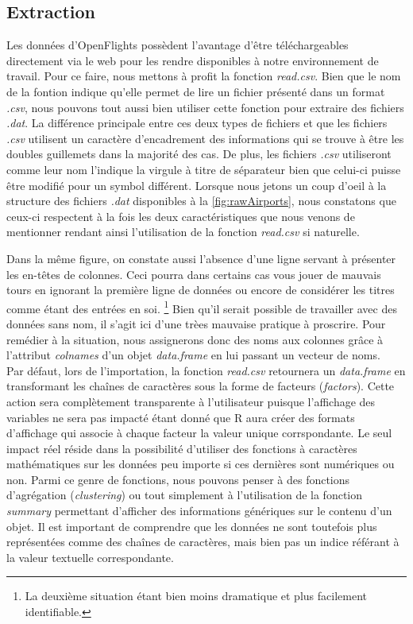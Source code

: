\subsection{Extraction}
\label{subsec:extraction}
Les données d'OpenFlights possèdent l'avantage d'être téléchargeables directement via le web pour les rendre disponibles à notre environnement de travail. Pour ce faire, nous mettons à profit la fonction \emph{read.csv}. Bien que le nom de la fontion indique qu'elle permet de lire un fichier présenté dans un format \emph{.csv}, nous pouvons tout aussi bien utiliser cette fonction pour extraire des fichiers \emph{.dat}. La différence principale entre ces deux types de fichiers et que les fichiers \emph{.csv} utilisent un caractère d'encadrement des informations qui se trouve à être les doubles guillemets dans la majorité des cas. De plus, les fichiers \emph{.csv} utiliseront comme leur nom l'indique la virgule à titre de séparateur bien que celui-ci puisse être modifié pour un symbol différent.\cite{CSVDAT} Lorsque nous jetons un coup d'oeil à la structure des fichiers \emph{.dat} disponibles à la \autoref{fig:rawAirports}, nous constatons que ceux-ci respectent à la fois les deux caractéristiques que nous venons de mentionner rendant ainsi l'utilisation de la fonction \emph{read.csv} si naturelle. \\


\noindent
Dans la même figure, on constate aussi l'absence d'une ligne servant à présenter les en-têtes de colonnes. Ceci pourra dans certains cas vous jouer de mauvais tours en ignorant la première ligne de données ou encore de considérer les titres comme étant des entrées en soi. \footnote{La deuxième situation étant bien moins dramatique et plus facilement identifiable.}  Bien qu'il serait possible de travailler avec des données sans nom, il s'agit ici d'une trèes mauvaise pratique à proscrire. Pour remédier à la situation, nous assignerons donc des noms aux colonnes grâce à l'attribut \emph{colnames} d'un objet \emph{data.frame} en lui passant un vecteur de noms.\\

\noindent
Par défaut, lors de l'importation, la fonction \emph{read.csv} retournera un \emph{data.frame} en transformant les chaînes de caractères sous la forme de facteurs (\emph{factors}). Cette action sera complètement transparente à l'utilisateur puisque l'affichage des variables ne sera pas impacté étant donné que R aura créer des formats d'affichage qui associe à chaque facteur la valeur unique corrspondante. Le seul impact réel réside dans la possibilité d'utiliser des fonctions à caractères mathématiques sur les données peu importe si ces dernières sont numériques ou non. Parmi ce genre de fonctions, nous pouvons penser à des fonctions d'agrégation (\emph{clustering}) ou tout simplement à l'utilisation de la fonction \emph{summary} permettant d'afficher des informations génériques sur le contenu d'un objet. Il est important de comprendre que les données ne sont toutefois plus représentées comme des chaînes de caractères, mais bien pas un indice référant à la valeur textuelle correspondante. \\

